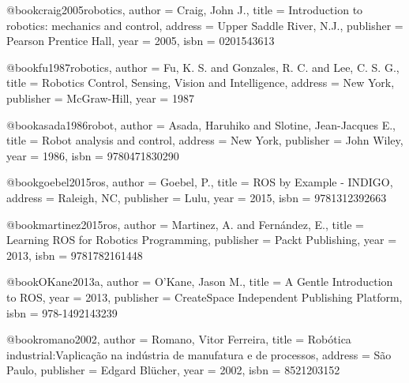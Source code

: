 %

@book{craig2005robotics,
  author = {Craig, John J.},
  title = {Introduction to robotics: mechanics and control},
  address = {Upper Saddle River, N.J.},
  publisher = {Pearson Prentice Hall},
  year = {2005},
  isbn = {0201543613}
}

@book{fu1987robotics,
  author = {Fu, K. S. and Gonzales, R. C. and Lee, C. S. G.},
  title = {Robotics Control, Sensing, Vision and Intelligence},
  address = {New York},
  publisher = {McGraw-Hill},
  year = {1987}
}

@book{asada1986robot,
  author = {Asada, Haruhiko and Slotine, Jean-Jacques E.},
  title = {Robot analysis and control},
  address = {New York},
  publisher = {John Wiley},
  year = {1986},
  isbn = {9780471830290}
}

@book{goebel2015ros,
  author = {Goebel, P.},
  title = {ROS by Example - INDIGO},
  address = {Raleigh, NC},
  publisher = {Lulu},
  year = {2015},
  isbn = {9781312392663}
}

@book{martinez2015ros,
  author = {Martinez, A. and Fernández, E.},
  title = {Learning ROS for Robotics Programming},
  publisher = {Packt Publishing},
  year = {2013},
  isbn = {9781782161448}
}



@book{OKane2013a,
  author = {O'Kane, Jason M.},
  title = {A Gentle Introduction to ROS},
  year = {2013},
  publisher = {CreateSpace Independent Publishing Platform},
  isbn = {978-1492143239}
}

@book{romano2002,
  author = {Romano, Vitor Ferreira},
  title = {Robótica industrial:Vaplicação na indústria de manufatura e de processos},
  address = {São Paulo},
  publisher = {Edgard Blücher},
  year = {2002},
  isbn = {8521203152}
}

